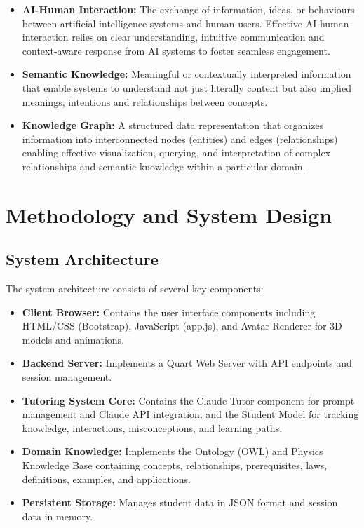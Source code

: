 \documentclass[a4paper,11pt,oneside]{article}
\begin{document}
\begin{itemize}
    \item \textbf{AI-Human Interaction:} The exchange of information, ideas, or behaviours between artificial intelligence systems and 
    human users. Effective AI-human interaction relies on clear understanding, intuitive communication and context-aware response from 
    AI systems to foster seamless engagement.
    
    \item \textbf{Semantic Knowledge:} Meaningful or contextually interpreted information that enable systems to understand not just 
    literally content but also implied meanings, intentions and relationships between concepts.
    
    \item \textbf{Knowledge Graph:} A structured data representation that organizes information into interconnected nodes (entities) 
    and edges (relationships) enabling effective visualization, querying, and interpretation of complex relationships and semantic 
    knowledge within a particular domain.
  \end{itemize}

  \section{Methodology and System Design}

  \subsection{System Architecture}

  The system architecture consists of several key components:

  \begin{itemize}
    \item \textbf{Client Browser:} Contains the user interface components including HTML/CSS (Bootstrap), JavaScript (app.js), 
    and Avatar Renderer for 3D models and animations.
    
    \item \textbf{Backend Server:} Implements a Quart Web Server with API endpoints and session management.
    
    \item \textbf{Tutoring System Core:} Contains the Claude Tutor component for prompt management and Claude API integration, 
    and the Student Model for tracking knowledge, interactions, misconceptions, and learning paths.
    
    \item \textbf{Domain Knowledge:} Implements the Ontology (OWL) and Physics Knowledge Base containing concepts, relationships, 
    prerequisites, laws, definitions, examples, and applications.
    
    \item \textbf{Persistent Storage:} Manages student data in JSON format and session data in memory.
  \end{itemize}
\end{document}

